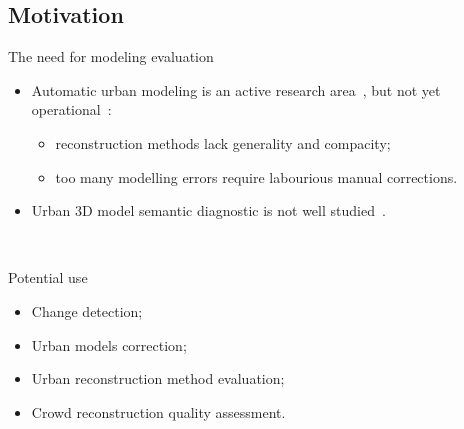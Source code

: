 \documentclass[export]{beamer}
\begin{document}
        \subsection{Motivation}
            \begin{frame}{The need for modeling evaluation}
                \begin{itemize}[label=$\blacktriangleright$, font=\color{IGNGreen}]
                    \item<1-> Automatic urban modeling is an active research area~\citep{Musialski2012}, but not \textcolor{IGNRed}{yet operational}~\citep{rottensteiner2014results}:
                    \begin{itemize}[label=--]
                        \item reconstruction methods lack generality and compacity;
                        \item too many modelling errors require labourious manual corrections.
                    \end{itemize}
                    \item<2-> Urban 3D model semantic diagnostic is not well studied~\citep{nguatem2017modeling}.
                \end{itemize}
                ~\\
            \end{frame}
            \begin{frame}{Potential use}
                \begin{itemize}[label=$\blacktriangleright$, font=\color{IGNGreen}, itemsep=2em]
                    \item<1-> Change detection;
                    \item<2-> Urban models correction;
                    \item<3-> Urban reconstruction method evaluation;
                    \item<4-> Crowd reconstruction quality assessment.
                \end{itemize}
            \end{frame}
\end{document}
